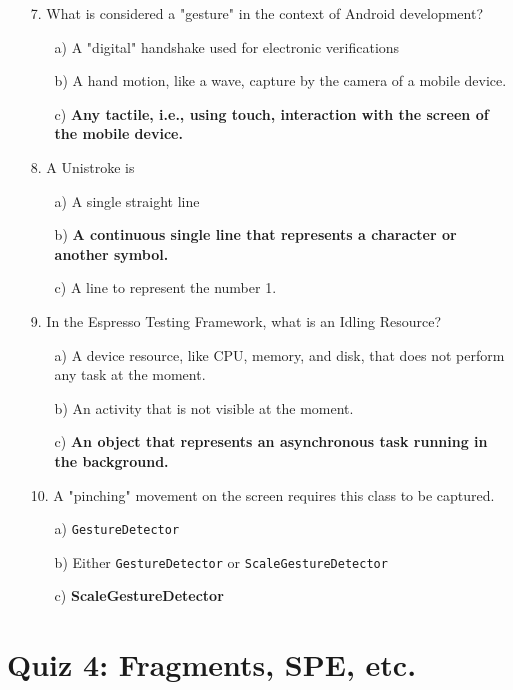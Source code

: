 \documentclass[12pt]{book}
\begin{document}
\begin{itemize}
    \item[7.] What is considered a "gesture" in the context of Android development?
    \begin{itemize}
        \item[a)] A "digital" handshake used for electronic verifications
        \item[b)] A hand motion, like a wave, capture by the camera of a mobile device.
        \item[c)] \textbf{Any tactile, i.e., using touch, interaction with the screen of the mobile device.}
    \end{itemize}

    \item[8.] A Unistroke is
    \begin{itemize}
        \item[a)] A single straight line
        \item[b)] \textbf{A continuous single line that represents a character or another symbol.}
        \item[c)] A line to represent the number 1.
    \end{itemize}

    \item[9.] In the Espresso Testing Framework, what is an Idling Resource?
    \begin{itemize}
        \item[a)] A device resource, like CPU, memory, and disk, that does not perform any task at the moment.
        \item[b)] An activity that is not visible at the moment.
        \item[c)] \textbf{An object that represents an asynchronous task running in the background.}
    \end{itemize}

    \item[10.] A "pinching" movement on the screen requires this class to be captured.
    \begin{itemize}
        \item[a)] \texttt{GestureDetector}
        \item[b)] Either \texttt{GestureDetector} or \texttt{ScaleGestureDetector}
        \item[c)] \textbf{ScaleGestureDetector}
    \end{itemize}

\end{itemize}

\section*{Quiz 4: Fragments, SPE, etc.}
\end{document}
